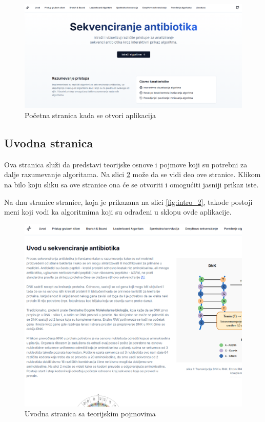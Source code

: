 \documentclass[12pt,oneside]{memoir}
\begin{document}
\begin{figure}[H]
\centering
\includegraphics[width=1\textwidth]{images/landing_page.png}
\caption{Početna stranica kada se otvori aplikacija}
\label{fig:landing_page}
\end{figure}

\subsection{Uvodna stranica}

Ova stranica služi da predstavi teorijske osnove i pojmove koji su potrebni za dalje razumevanje algoritama. Na slici \ref{fig:intro_1} može da se vidi deo ove stranice. Klikom na bilo koju sliku sa ove stranice ona će se otvoriti i omogućiti jasniji prikaz iste.

Na dnu stranice stranice, koja je prikazana na slici \ref{fig:intro_2}, takođe postoji meni koji vodi ka algoritmima koji su odrađeni u sklopu ovde aplikacije.

\begin{figure}[H]
\centering
\includegraphics[width=1\textwidth]{images/intro_1.png}
\caption{Uvodna stranica sa teorijskim pojmovima}
\label{fig:intro_1}
\end{figure}
\end{document}
